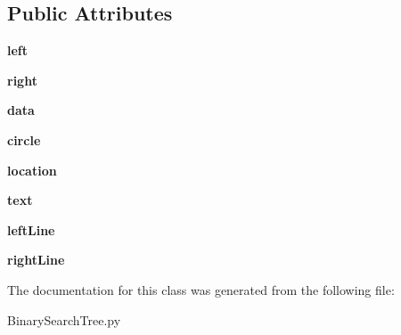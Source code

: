 \subsection*{Public Attributes}
\begin{DoxyCompactItemize}
\item 
\mbox{\label{class_binary_search_tree_1_1_binary_tree_node_a2a7329ecef9597b0639d5e56d1fb9e98}} 
{\bfseries left}
\item 
\mbox{\label{class_binary_search_tree_1_1_binary_tree_node_a8ec787cb980f443ef91e36adbc07f03b}} 
{\bfseries right}
\item 
\mbox{\label{class_binary_search_tree_1_1_binary_tree_node_a7dc751865b03d93d7a2eaf8e0453021f}} 
{\bfseries data}
\item 
\mbox{\label{class_binary_search_tree_1_1_binary_tree_node_a06a5a777f647a7fd179e98e6908fb7c9}} 
{\bfseries circle}
\item 
\mbox{\label{class_binary_search_tree_1_1_binary_tree_node_a5105a9ac24008de97b2243aa8ceb9566}} 
{\bfseries location}
\item 
\mbox{\label{class_binary_search_tree_1_1_binary_tree_node_acc17cecd9513b2d26b8b1c777d72407f}} 
{\bfseries text}
\item 
\mbox{\label{class_binary_search_tree_1_1_binary_tree_node_abef335231af642d070f64122033f2ff7}} 
{\bfseries left\+Line}
\item 
\mbox{\label{class_binary_search_tree_1_1_binary_tree_node_a2fb1088533007be5718735e39080f6c9}} 
{\bfseries right\+Line}
\end{DoxyCompactItemize}


The documentation for this class was generated from the following file\+:\begin{DoxyCompactItemize}
\item 
Binary\+Search\+Tree.\+py\end{DoxyCompactItemize}
